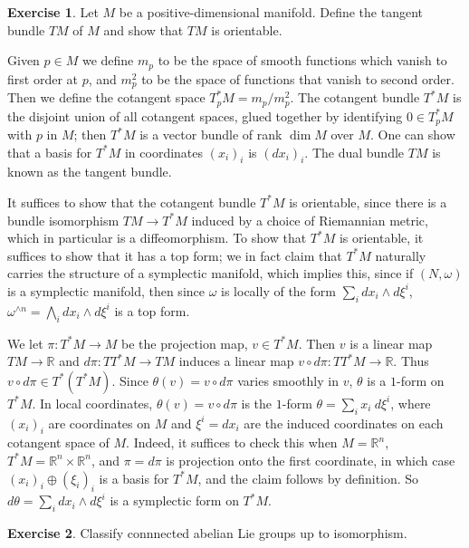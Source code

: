 \documentclass[10pt]{article}
\newcommand{\RR}{\mathbb{R}}
\theoremstyle{definition}
\newtheorem{exer}{Exercise}
\begin{document}
\begin{exer}
Let $M$ be a positive-dimensional manifold. Define the tangent bundle $TM$ of $M$ and show that $TM$ is orientable.
\end{exer}

Given $p \in M$ we define $m_p$ to be the space of smooth functions which vanish to first order at $p$, and $m_p^2$ to be the space of functions that vanish to second order.
Then we define the cotangent space $T^*_pM = m_p/m_p^2$.
The cotangent bundle $T^*M$ is the disjoint union of all cotangent spaces, glued together by identifying $0 \in T^*_pM$ with $p$ in $M$; then $T^*M$ is a vector bundle of rank $\dim M$ over $M$.
One can show that a basis for $T^*M$ in coordinates $(x_i)_i$ is $(dx_i)_i$.
The dual bundle $TM$ is known as the tangent bundle.

It suffices to show that the cotangent bundle $T^*M$ is orientable, since there is a bundle isomorphism $TM \to T^*M$ induced by a choice of Riemannian metric, which in particular is a diffeomorphism.
To show that $T^*M$ is orientable, it suffices to show that it has a top form; we in fact claim that $T^*M$ naturally carries the structure of a symplectic manifold, which implies this, since if $(N, \omega)$ is a symplectic manifold, then since $\omega$ is locally of the form $\sum_i dx_i \wedge d\xi^i$, $\omega^{\wedge n} = \bigwedge_i dx_i \wedge d\xi^i$ is a top form.

We let $\pi: T^*M \to M$ be the projection map, $v \in T^*M$. Then $v$ is a linear map $TM \to \RR$ and $d\pi: TT^*M \to TM$ induces a linear map $v \circ d\pi: TT^*M \to \RR$. Thus $v \circ d\pi \in T^*(T^*M)$.
Since $\theta(v) = v \circ d\pi$ varies smoothly in $v$, $\theta$ is a $1$-form on $T^*M$.
In local coordinates, $\theta(v) = v \circ d\pi$ is the $1$-form $\theta = \sum_i x_i ~d\xi^i$, where $(x_i)_i$ are coordinates on $M$ and $\xi^i = dx_i$ are the induced coordinates on each cotangent space of $M$.
Indeed, it suffices to check this when $M = \RR^n$, $T^*M = \RR^n \times \RR^n$, and $\pi = d\pi$ is projection onto the first coordinate, in which case $(x_i)_i \oplus (\xi_i)_i$ is a basis for $T^*M$, and the claim follows by definition.
So $d\theta = \sum_i dx_i \wedge d\xi^i$ is a symplectic form on $T^*M$.

\begin{exer}
Classify connnected abelian Lie groups up to isomorphism.
\end{exer}
\end{document}
